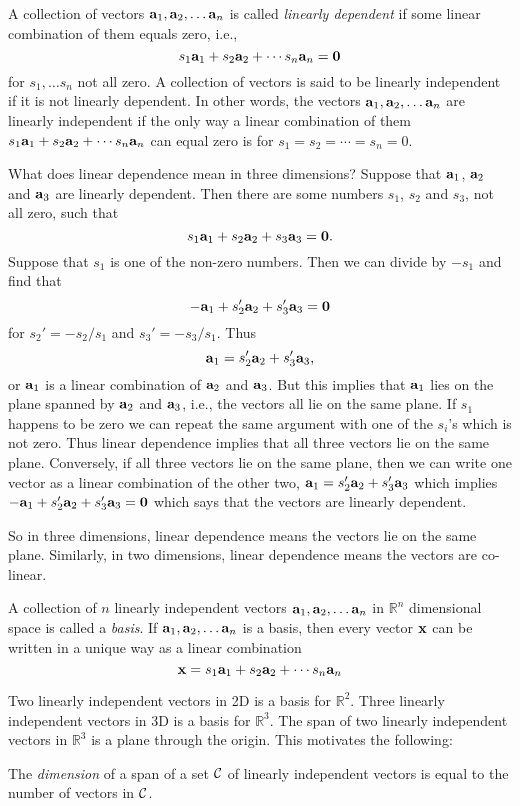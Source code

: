 \begin{definition}
A collection of vectors $\aa_1, \aa_2, \ldots \aa_n$ 
is called {\em linearly dependent} if some linear combination of them equals
zero, i.e., 
\[
s_1\aa_1 + s_2\aa_2 + \cdots s_n\aa_n =\zv
\]
for $s_1,\ldots s_n$ not all zero. A collection of vectors is said to be {\rm
linearly independent} if it is not linearly dependent. In other words, the
vectors $\aa_1, \aa_2, \ldots \aa_n$ are linearly independent if the only way a
linear combination of them $s_1\aa_1 + s_2\aa_2 + \cdots s_n\aa_n$ 
can equal zero is for $s_1=s_2=\cdots =s_n=0$.
\end{definition}

What does linear dependence mean in three dimensions? Suppose that $\aa_1$,
$\aa_2$ and $\aa_3$ are linearly dependent. Then there are some numbers
$s_1$, $s_2$ and $s_3$, not all zero, such that 
\[
s_1\aa_1 + s_2\aa_2 + s_3\aa_3=\zv.
\]
Suppose that $s_1$ is one of the non-zero numbers. Then we can
divide by $-s_1$ and find that 
$$-\aa_1+s_2'\aa_2 + s_3'\aa_3 =\zv$$ 
for
$s_2'=-s_2/s_1$ and $s_3'=-s_3/s_1$. Thus 
\[
\aa_1 = s_2'\aa_2 + s_3'\aa_3,
\]
or $\aa_1$ is a linear combination of $\aa_2$ and $\aa_3$. But this implies that
$\aa_1$ lies on the plane spanned by $\aa_2$ and $\aa_3$, i.e., the vectors
all lie on the same plane.  If $s_1$ happens to be 
zero we can repeat the same argument with one of the $s_i$'s which is not zero.
Thus linear dependence implies that all three vectors lie on the same plane. 
Conversely, if all three vectors lie on the same plane, then we can write one
vector as a linear combination of the other two, $\aa_1 = s_2'\aa_2 + s_3'\aa_3$
which implies $-\aa_1+s_2'\aa_2 + s_3'\aa_3 =\zv$ which says that the vectors
are linearly dependent. 

So in three dimensions, linear dependence means the vectors lie on the same
plane. 
Similarly, in two dimensions, linear dependence means the vectors are co-linear.

\begin{definition}
A collection of $n$ linearly independent 
vectors  $\aa_1, \aa_2, \ldots \aa_n$ in $\mathbb{R}^n$ dimensional space is called a
{\em basis}. 
If $\aa_1, \aa_2, \ldots \aa_n$ is a basis, then every vector 
$\xx$
can
be written in a unique way as a linear combination
\[
\xx=s_1\aa_1 + s_2\aa_2 + \cdots s_n\aa_n
\]
\end{definition} 

Two linearly independent vectors in 2D is a basis for $\mathbb{R}^2$. Three linearly independent vectors in 3D is a basis for $\mathbb{R}^3$. The span of two linearly independent vectors in $\mathbb{R}^3$ is a plane through the origin. This motivates the following:
\begin{definition}
The {\em dimension} of a span of a set $\cal C$ of linearly independent vectors is equal to the number of vectors in $\cal C$. 
\end{definition} 

